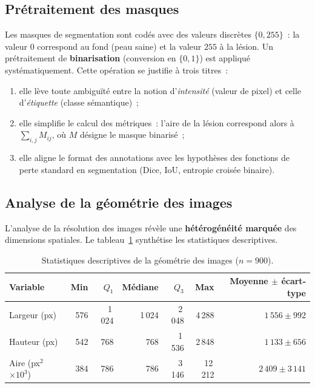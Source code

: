 \documentclass[12pt,a4paper]{article}
\begin{document}
\subsection{Prétraitement des masques}
\label{subsec:pretraitement}

Les masques de segmentation sont codés avec des valeurs discrètes $\{0, 255\}$~: la valeur $0$ correspond au fond (peau saine) et la valeur $255$ à la lésion. Un prétraitement de \textbf{binarisation} (conversion en $\{0, 1\}$) est appliqué systématiquement. Cette opération se justifie à trois titres~:
\begin{enumerate}[nosep]
    \item elle lève toute ambiguïté entre la notion d'\emph{intensité} (valeur de pixel) et celle d'\emph{étiquette} (classe sémantique)~;
    \item elle simplifie le calcul des métriques~: l'aire de la lésion correspond alors à $\sum_{i,j} M_{ij}$, où $M$ désigne le masque binarisé~;
    \item elle aligne le format des annotations avec les hypothèses des fonctions de perte standard en segmentation (Dice, IoU, entropie croisée binaire).
\end{enumerate}

\subsection{Analyse de la géométrie des images}
\label{subsec:geometrie}

L'analyse de la résolution des images révèle une \textbf{hétérogénéité marquée} des dimensions spatiales. Le tableau~\ref{tab:geometrie} synthétise les statistiques descriptives.

\begin{table}[H]
\centering
\caption{Statistiques descriptives de la géométrie des images ($n = 900$).}
\label{tab:geometrie}
\begin{tabular}{l r r r r r r}
\toprule
\textbf{Variable} & \textbf{Min} & \textbf{$Q_1$} & \textbf{Médiane} & \textbf{$Q_3$} & \textbf{Max} & \textbf{Moyenne $\pm$ écart-type} \\
\midrule
Largeur (px) & 576 & 1\,024 & 1\,024 & 2\,048 & 4\,288 & $1\,556 \pm 992$ \\
Hauteur (px) & 542 & 768 & 768 & 1\,536 & 2\,848 & $1\,133 \pm 656$ \\
Aire (px$^2$ $\times 10^3$) & 384 & 786 & 786 & 3\,146 & 12\,212 & $2\,409 \pm 3\,141$ \\
\bottomrule
\end{tabular}
\end{table}
\end{document}
